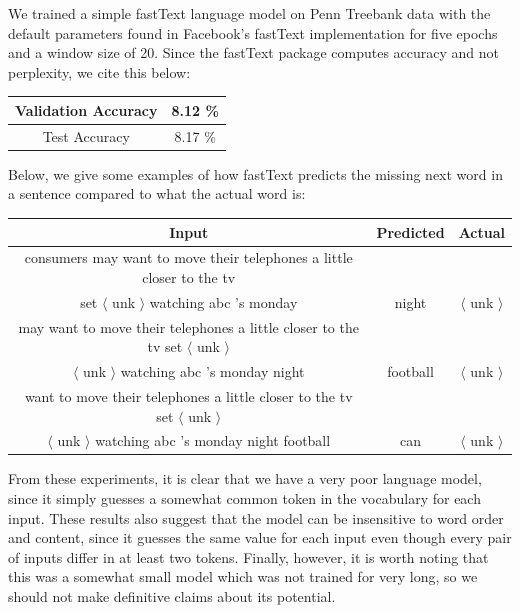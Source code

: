 \documentclass[a4paper]{article}
\begin{document}
\newline
\newline
We trained a simple fastText language model on Penn Treebank data with the default parameters found in Facebook's fastText implementation for five epochs and a window size of 20. Since the fastText package computes accuracy and not perplexity, we cite this below:

\begin{center}
\begin{tabular}{ |c|c| } 
 \hline
 Validation Accuracy & 8.12 \% \\ \hline
 Test Accuracy & 8.17 \% \\
 \hline
\end{tabular}
\end{center}

Below, we give some examples of how fastText predicts the missing next word in a sentence compared to what the actual word is:

\begin{center}
\begin{tabular}{ |c|c|c|} 
 \hline
Input & Predicted & Actual \\ \hline
consumers may want to move their telephones a little closer to the tv \\ set $\langle$ unk $\rangle$ watching abc 's monday & night & $\langle$ unk $\rangle$ \\ \hline
may want to move their telephones a little closer to the tv set $\langle$ unk $\rangle$ \\ $\langle$ unk $\rangle$ watching abc 's monday night & football & $\langle$ unk $\rangle$ \\ \hline
want to move their telephones a little closer to the tv set $\langle$ unk $\rangle$ \\ $\langle$ unk $\rangle$ watching abc 's monday night football & can & $\langle$ unk $\rangle$ \\ \hline
\end{tabular}
\end{center}

From these experiments, it is clear that we have a very poor language model, since it simply guesses a somewhat common token in the vocabulary for each input. These results also suggest that the model can be insensitive to word order and content, since it guesses the same value for each input even though every pair of inputs differ in at least two tokens. Finally, however, it is worth noting that this was a somewhat small model which was not trained for very long, so we should not make definitive claims about its potential.
\end{document}
